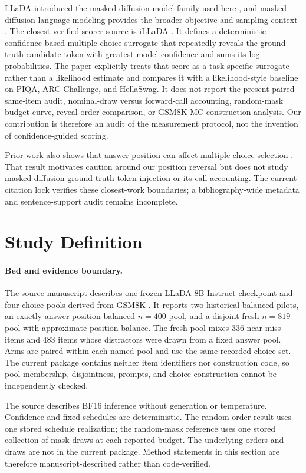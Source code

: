 \documentclass{article}
\begin{document}
LLaDA introduced the masked-diffusion model family used here
\citep{nie2025llada}, and masked diffusion language modeling provides the
broader objective and sampling context \citep{sahoo2024mdlm}.  The closest
verified scorer source is iLLaDA \citep{nie2026illada}.  It defines a
deterministic confidence-based multiple-choice surrogate that repeatedly
reveals the ground-truth candidate token with greatest model confidence and
sums its log probabilities.  The paper explicitly treats that score as a
task-specific surrogate rather than a likelihood estimate and compares it
with a likelihood-style baseline on PIQA, ARC-Challenge, and HellaSwag.  It
does not report the present paired same-item audit, nominal-draw versus
forward-call accounting, random-mask budget curve, reveal-order comparison,
or GSM8K-MC construction analysis.  Our contribution is therefore an audit of
the measurement protocol, not the invention of confidence-guided scoring.

Prior work also shows that answer position can affect multiple-choice
selection \citep{zheng2024selection}.  That result motivates caution around
our position reversal but does not study masked-diffusion ground-truth-token
injection or its call accounting.  The current citation lock verifies these
closest-work boundaries; a bibliography-wide metadata and sentence-support
audit remains incomplete.

\section{Study Definition}
\label{sec:setup}

\paragraph{Bed and evidence boundary.}
The source manuscript describes one frozen LLaDA-8B-Instruct checkpoint and
four-choice pools derived from GSM8K \citep{cobbe2021gsm8k}.  It reports two
historical balanced pilots, an exactly answer-position-balanced $n=400$ pool,
and a disjoint fresh $n=819$ pool with approximate position balance.  The
fresh pool mixes 336 near-miss items and 483 items whose distractors were drawn
from a fixed answer pool.  Arms are paired within each named pool and use the
same recorded choice set.  The current package contains neither item
identifiers nor construction code, so pool membership, disjointness, prompts,
and choice construction cannot be independently checked.

The source describes BF16 inference without generation or temperature.
Confidence and fixed schedules are deterministic.  The random-order result
uses one stored schedule realization; the random-mask reference uses one
stored collection of mask draws at each reported budget.  The underlying
orders and draws are not in the current package.  Method statements in this
section are therefore manuscript-described rather than code-verified.
\end{document}
